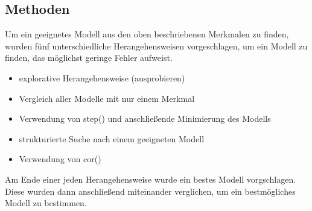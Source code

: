 \subsection{Methoden}
Um ein geeignetes Modell aus den oben beschriebenen Merkmalen zu finden, wurden f\"unf unterschiedliche Herangehensweisen vorgeschlagen, um ein Modell zu finden, das m\"oglichst geringe Fehler aufweist.
\begin{itemize}
	\item explorative Herangehensweise (ausprobieren)
	\item Vergleich aller Modelle mit nur einem Merkmal
	\item Verwendung von step() und anschlie\ss{}ende Minimierung des Modells
	\item strukturierte Suche nach einem geeigneten Modell
	\item Verwendung von cor()
\end{itemize}
Am Ende einer jeden Herangehensweise wurde ein bestes Modell vorgschlagen. Diese wurden dann anschlie\ss{}end miteinander verglichen, um ein bestm\"ogliches Modell zu bestimmen.
\par\smallskip

